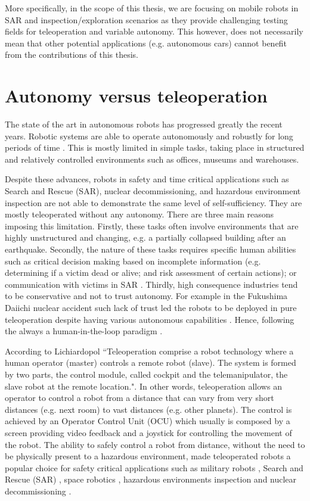\documentclass[a4paper,12pt,oneside,openright]{bhamthesis}
\begin{document}
More specifically, in the scope of this thesis, we are focusing on mobile robots in SAR and inspection/exploration scenarios as they provide challenging testing fields for teleoperation and variable autonomy. This however, does not necessarily mean that other potential applications (e.g. autonomous cars) cannot benefit from the contributions of this thesis.

\section{Autonomy versus teleoperation}
The state of the art in autonomous robots has progressed greatly the recent years. Robotic systems are able to operate autonomously and robustly for long periods of time \citep{Marder-Eppstein2010}. This is mostly limited in simple tasks, taking place in structured and relatively controlled environments such as offices, museums and warehouses.

Despite these advances, robots in safety and time critical applications such as Search and Rescue (SAR), nuclear decommissioning, and hazardous environment inspection are not able to demonstrate the same level of self-sufficiency. They are mostly teleoperated without any autonomy. There are three main reasons imposing this limitation. Firstly, these tasks often involve environments that are highly unstructured and changing, e.g. a partially collapsed building after an earthquake. Secondly, the nature of these tasks requires specific human abilities such as critical decision making based on incomplete information (e.g. determining if a victim dead or alive; and risk assessment of certain actions); or communication with victims in SAR \citep{Dole2015}. Thirdly, high consequence industries tend to be conservative and not to trust autonomy. For example in the Fukushima Daiichi nuclear accident such lack of trust led the robots to be deployed in pure teleoperation despite having various autonomous capabilities \citep{Nagatani2013}. Hence, following the always a human-in-the-loop paradigm \citep{Murphy2004}.

According to Lichiardopol \citep{Lichiardopol2007} ``Teleoperation comprise a robot technology where a human operator (master) controls a remote robot (slave). The system is formed by two parts, the control module, called cockpit and the telemanipulator, the slave robot at the remote location.". In other words, teleoperation allows an operator to control a robot from a distance that can vary from very short distances (e.g. next room) to vast distances (e.g. other planets). The control is achieved by an Operator Control Unit (OCU) which usually is composed by a screen providing video feedback and a joystick for controlling the movement of the robot. The ability to safely control a robot from distance, without the need to be physically present to a hazardous environment, made teleoperated robots a popular choice for safety critical applications such as military robots \citep{Khurshid2004}, Search and Rescue (SAR) \citep{Blitch1996,kadous2005caster,Murphy2004}, space robotics \citep{Sheridan1993}, hazardous environments inspection \citep{Bruemmer2003a} and nuclear decommissioning \citep{Seward2005}.
\end{document}
